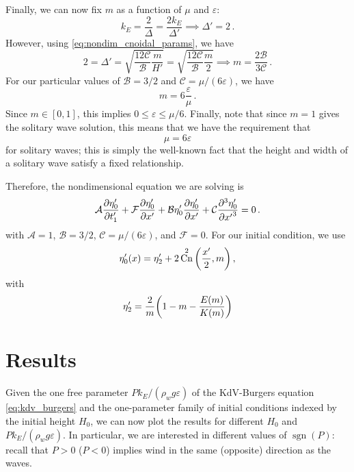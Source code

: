 \documentclass{jfm}
\DeclareMathOperator{\cn}{Cn}
\DeclareMathOperator{\sgn}{sgn}
\renewcommand*{\epsilon}{\varepsilon}
\begin{document}
Finally, we can now fix $m$ as a function of $\mu$ and $\epsilon$:
\begin{equation}
  k_E = \frac{2}{\Delta} = \frac{2 k_E}{\Delta'}
  \implies \Delta' = 2 \,.
\end{equation}
However, using \cref{eq:nondim_cnoidal_params}, we have
\begin{equation}
  2 = \Delta ' = \sqrt{\frac{12 \mathcal{C}}{\mathcal{B}}
    \frac{m}{H'}}
  = \sqrt{\frac{12 \mathcal{C}}{\mathcal{B}} \frac{m}{2}}
  \implies m = \frac{2 \mathcal{B}}{3 \mathcal{C}} \,.
\end{equation}
For our particular values of $\mathcal{B} = 3/2$ and $\mathcal{C} =
\mu/(6 \epsilon)$, we have
\begin{equation}
  m = 6 \frac{\epsilon}{\mu} \,.
\end{equation}
Since $m \in [0,1]$, this implies $0 \le \epsilon \le \mu/6$.
Finally, note that since $m = 1$ gives the solitary wave solution, this
means that we have the requirement that
\begin{equation}
  \mu = 6 \epsilon
\end{equation}
for solitary waves; this is simply the well-known fact that the height
and width of a solitary wave satisfy a fixed relationship.

Therefore, the nondimensional equation we are solving is
\begin{equation}
  \mathcal{A} \pdv{\eta'_0}{t'_1} + \mathcal{F} \pdv{\eta'_0}{x'} + \mathcal{B}
  \eta'_0 \pdv{\eta'_0}{x'} + \mathcal{C} \pdv[3]{\eta'_0}{{x'}} = 0 \,.
\end{equation}
with $\mathcal{A} = 1$, $\mathcal{B} = 3/2$, $\mathcal{C} =
\mu/(6\epsilon)$, and $\mathcal{F} = 0$.
For our initial condition, we use
\begin{equation}
  \eta'_0(x) = \eta'_2 + 2 \cn^2\pqty{\frac{x'}{2} , m} \,,
\end{equation}
with
\begin{equation}
  \eta'_2 = \frac{2}{m} \pqty{1 - m - \frac{E(m)}{K(m)}}
\end{equation}

\section{Results}
Given the one free parameter $P k_E/(\rho_w g \epsilon)$ of the
KdV-Burgers equation \cref{eq:kdv_burgers} and the one-parameter family of
initial conditions indexed by the initial height $H_0$, we can now plot the
results for different $H_0$ and $P k_E/(\rho_w g \epsilon)$.
In particular, we are interested in different values of $\sgn(P)$:
recall that $P>0$ ($P<0$) implies wind in the same (opposite) direction
as the waves.
\end{document}

